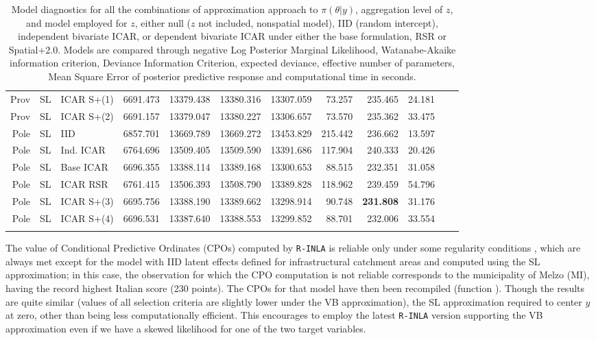 \documentclass{book}
\begin{document}
\begin{appendices}
\begin{table}[ht]
\begin{tabular}{rlllrrrrrrrr}
  Prov & SL & ICAR S+(1) & 6691.473 & 13379.438 & 13380.316 & 13307.059 & 73.257 & 235.465 & 24.181 \\ 
  Prov & SL & ICAR S+(2) & 6691.157 & 13379.047 & 13380.227 & 13306.657 & 73.570 & 235.362 & 33.475 \\ 
  Pole & SL & IID & 6857.701\footnotemark[1]  & 13669.789 & 13669.272 & 13453.829 & 215.442 & 236.662 & 13.597 \\ 
  Pole & SL & Ind. ICAR & 6764.696 & 13509.405 & 13509.590 & 13391.686 & 117.904 & 240.333 & 20.426 \\ 
  Pole & SL & Base ICAR & 6696.355 & 13388.114 & 13389.168 & 13300.653 & 88.515 & 232.351 & 31.058 \\ 
  Pole & SL & ICAR RSR & 6761.415 & 13506.393 & 13508.790 & 13389.828 & 118.962 & 239.459 & 54.796 \\ 
  Pole & SL & ICAR S+(3) & 6695.756 & 13388.190 & 13389.662 & 13298.914 & 90.748 & \textbf{231.808} & 31.176 \\  
  Pole & SL & ICAR S+(4) & 6696.531 & 13387.640 & 13388.553 & 13299.852 & 88.701 & 232.006 & 33.554 \\ 
    \botrule \end{tabular}
\caption{Model diagnostics for all the combinations of approximation approach to $\pi(\theta | y)$, aggregation level of $z$, and model employed for $z$, either null ($z$ not included, nonspatial model), IID (random intercept), independent bivariate ICAR, or dependent bivariate ICAR under either the base formulation, RSR or Spatial+2.0. Models are compared through negative Log Posterior Marginal Likelihood, Watanabe-Akaike information criterion, Deviance Information Criterion, expected deviance, effective number of parameters, Mean Square Error of posterior predictive response and computational time in seconds.}
\label{tab:ICAR}
\end{table}



The value of Conditional Predictive Ordinates (CPOs) computed by \texttt{R-INLA} is reliable only under some regularity conditions \citep{CPOINLA}, which are always met except for the model with IID latent effects defined for infrastructural catchment areas and computed using the SL approximation; in this case, the observation for which the CPO computation is not reliable corresponds to the municipality of Melzo (MI), having the record highest Italian score (230 points). The CPOs for that model have then been recompiled (function \texttt{}). 
Though the results are quite similar (values of all selection criteria are slightly lower under the VB approximation), the SL approximation required to center $y$ at zero, other than being less computationally efficient. This encourages to employ the latest \texttt{R-INLA} version supporting the VB approximation even if we have a skewed likelihood for one of the two target variables.


\end{appendices}
\end{document}
